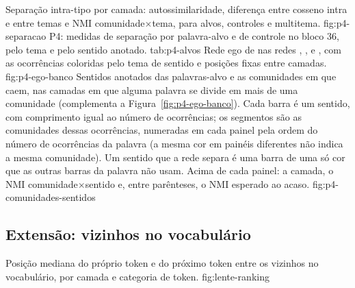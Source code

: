     {Separação intra-tipo por camada: autossimilaridade, diferença entre cosseno intra e entre
    temas e NMI comunidade$\times$tema, para alvos, controles e multitema.}
    {fig:p4-separacao}
    {P4: medidas de separação por palavra-alvo e de controle no bloco 36, pelo tema e pelo
    sentido anotado.}
    {tab:p4-alvos}
    {Rede ego de  nas redes , ,  e , com
    as ocorrências coloridas pelo tema de sentido e posições fixas entre camadas.}
    {fig:p4-ego-banco}
    {Sentidos anotados das palavras-alvo e as comunidades em que caem, nas camadas em que
    alguma palavra se divide em mais de uma comunidade (complementa a
    Figura~\ref{fig:p4-ego-banco}). Cada barra é um sentido, com comprimento igual ao número de
    ocorrências; os segmentos são as comunidades dessas ocorrências, numeradas em cada painel
    pela ordem do número de ocorrências da palavra (a mesma cor em painéis diferentes não indica
    a mesma comunidade). Um sentido que a rede separa é uma barra de uma só cor que as outras
    barras da palavra não usam. Acima de cada painel: a camada, o NMI comunidade$\times$sentido
    e, entre parênteses, o NMI esperado ao acaso.}
    {fig:p4-comunidades-sentidos}

\subsection{Extensão: vizinhos no vocabulário}\label{sec:res-lente}


    {Posição mediana do próprio token e do próximo token entre os vizinhos no vocabulário, por
    camada e categoria de token.}
    {fig:lente-ranking}
